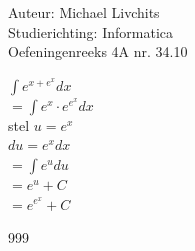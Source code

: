 \documentclass[a4paper]{article}
\begin{document}
  
\noindent \large Auteur: Michael Livchits \\
\noindent \large Studierichting: Informatica\\
\noindent \large Oefeningenreeks 4A nr. 34.10\\

\medskip

\normalsize

$\displaystyle\int e^{x+e^x}dx$\\

$=\displaystyle\int e^{x}\cdot e^{e^x}dx$\\

stel $u = e^x$\\

$du = e^xdx$\\

$= \displaystyle\int e^udu$\\

$= e^u + C$\\

$= e^{e^x} + C$\\

\begin{thebibliography}{999}
\end{thebibliography}
\end{document}
